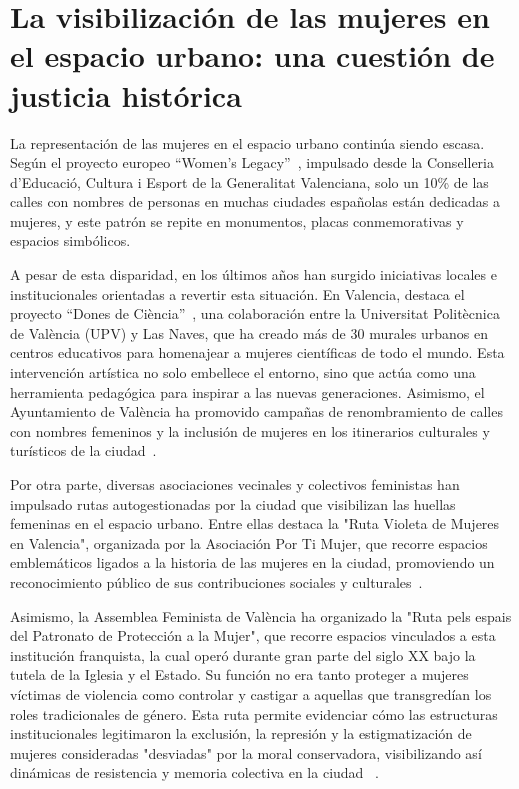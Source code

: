 \section{La visibilización de las mujeres en el espacio urbano: una cuestión de justicia histórica}

La representación de las mujeres en el espacio urbano continúa siendo escasa. Según el proyecto europeo “Women’s Legacy”~\cite{womenslegacy2022}, impulsado desde la Conselleria d’Educació, Cultura i Esport de la Generalitat Valenciana, solo un 10\% de las calles con nombres de personas en muchas ciudades españolas están dedicadas a mujeres, y este patrón se repite en monumentos, placas conmemorativas y espacios simbólicos. 

A pesar de esta disparidad, en los últimos años han surgido iniciativas locales e institucionales orientadas a revertir esta situación. En Valencia, destaca el proyecto “Dones de Ciència”~\cite{lasnaves2020}, una colaboración entre la Universitat Politècnica de València (UPV) y Las Naves, que ha creado más de 30 murales urbanos en centros educativos para homenajear a mujeres científicas de todo el mundo. Esta intervención artística no solo embellece el entorno, sino que actúa como una herramienta pedagógica para inspirar a las nuevas generaciones. Asimismo, el Ayuntamiento de València ha promovido campañas de renombramiento de calles con nombres femeninos y la inclusión de mujeres en los itinerarios culturales y turísticos de la ciudad~\cite{ayuntamientovalencia2023}.

Por otra parte, diversas asociaciones vecinales y colectivos feministas han impulsado rutas autogestionadas por la ciudad que visibilizan las huellas femeninas en el espacio urbano. Entre ellas destaca la "Ruta Violeta de Mujeres en Valencia", organizada por la Asociación Por Ti Mujer, que recorre espacios emblemáticos ligados a la historia de las mujeres en la ciudad, promoviendo un reconocimiento público de sus contribuciones sociales y culturales~\cite{portimujer2023}.

Asimismo, la Assemblea Feminista de València ha organizado la "Ruta pels espais del Patronato de Protección a la Mujer", que recorre espacios vinculados a esta institución franquista, la cual operó durante gran parte del siglo XX bajo la tutela de la Iglesia y el Estado. Su función no era tanto proteger a mujeres víctimas de violencia como controlar y castigar a aquellas que transgredían los roles tradicionales de género. Esta ruta permite evidenciar cómo las estructuras institucionales legitimaron la exclusión, la represión y la estigmatización de mujeres consideradas "desviadas" por la moral conservadora, visibilizando así dinámicas de resistencia y memoria colectiva en la ciudad ~\cite{assemblea2023}.

